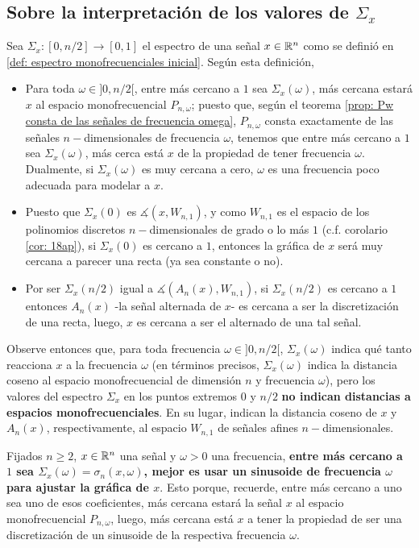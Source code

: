 \subsection{Sobre la interpretación de los valores de $\Sigma_{x}$}
Sea $\Sigma_{x}:[0, n/2] \longrightarrow [0,1]$ el espectro 
de una señal $x \in \mathbb{R}^{n}$
como se definió en \ref{def: espectro monofrecuenciales inicial}.
Según esta definición,
\begin{itemize}
	\item Para toda $\omega \in ]0, n/2[$, entre más cercano 
	a $1$ sea $\Sigma_{x}(\omega)$, más cercana estará $x$
	al espacio monofrecuencial $P_{n, \omega}$; puesto que,
	según el teorema \ref{prop: Pw consta de las señales de frecuencia omega},
	$P_{n, \omega}$ consta exactamente de las señales 
	$n-$dimensionales de frecuencia $\omega$, tenemos que 
	entre más cercano a $1$ sea $\Sigma_{x}(\omega)$, más cerca
	está $x$ de la propiedad de tener frecuencia $\omega$. Dualmente,
	si $\Sigma_{x}(\omega)$ es muy cercana a cero, $\omega$ es una frecuencia
	poco adecuada para modelar a $x$.
	
	\item Puesto que $\Sigma_{x}(0)$ es  $\measuredangle(x, W_{n,1})$, 
	y como $W_{n,1}$ es el espacio de los polinomios discretos
	$n-$dimensionales de grado o lo más $1$ (c.f. 
	corolario \ref{cor: 18ap}),
	si $\Sigma_{x}(0)$ es cercano a $1$, entonces la gráfica de
	$x$ será muy cercana a parecer una recta (ya sea constante o no).
	
	\item Por ser $\Sigma_{x}(n/2)$ igual a  $\measuredangle(A_{n}(x), W_{n,1})$,
	si $\Sigma_{x}(n/2)$ es cercano a $1$ entonces $A_{n}(x)$ -la señal 
	alternada de $x$- es cercana a ser la discretización de una recta, luego,
	$x$ es cercana a ser el alternado de una tal señal.
	
\end{itemize}

Observe entonces que, para toda frecuencia $\omega \in ]0, n/2[$,
$\Sigma_{x}(\omega)$ indica qué tanto reacciona $x$ a la frecuencia
$\omega$ (en términos precisos, $\Sigma_{x}(\omega)$ indica la distancia
coseno al espacio monofrecuencial de dimensión $n$ y frecuencia $\omega$),
pero los valores del espectro $\Sigma_{x}$ en los puntos 
extremos $0$ y $n/2$ \textbf{no indican distancias a espacios monofrecuenciales}.
En su lugar, indican la distancia coseno de $x$ y $A_{n}(x)$, respectivamente,
al espacio $W_{n,1}$ de señales afines $n-$dimensionales.


\begin{nota}
\label{nota: la mejor frecuencia}
Fijados $n \geq 2$,
$x \in \mathbb{R}^{n}$ una señal y
$\omega >0$ una frecuencia, \textbf{entre más cercano a $1$ sea 
$\Sigma_{x}(\omega) = \sigma_{n}(x, \omega)$, mejor es usar un sinusoide
de frecuencia $\omega$ para ajustar la gráfica de $x$}.
Esto porque, recuerde, entre más cercano a uno sea uno de
esos coeficientes, más cercana estará la señal $x$ 
al espacio monofrecuencial $P_{n, \omega}$, luego, más
cercana está $x$
a tener
la propiedad de ser una discretización de un sinusoide
de la respectiva frecuencia $\omega$.
\end{nota}
